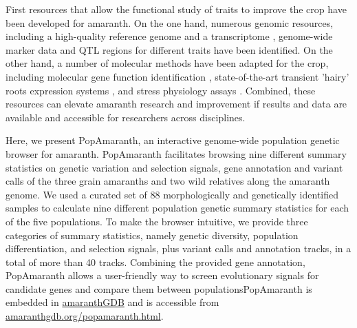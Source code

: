 \documentclass[9pt,twocolumn,twoside]{celabRxiv}
\newcommand{\jgd}[1]{{\small \textcolor{red}{#1}}}
\begin{document}
First resources that allow the functional study of traits to improve the crop have been developed for amaranth.
On the one hand, numerous genomic resources, including a high-quality reference genome \citep{lightfoot2017single} and a transcriptome \citep{clouse2016amaranth}, genome-wide marker data \citep{mallory2008development, kietlinski2014relationships, stetter2017genomic, stetter2020parallel} and QTL regions for different traits \citep{lightfoot2017single,stetter2020parallel} have been identified.
On the other hand, a number of molecular methods have been adapted for the crop, including molecular gene function identification \citep{massange2016overexpression}, state-of-the-art transient 'hairy' roots expression systems \citep{hatlestad2015beet,frier2020agro}, and stress physiology assays \citep{parra2014burkholderia, delano2011transcriptomic, massange2015novel}. 
Combined, these resources can elevate amaranth research and improvement if results and data are available and accessible for researchers across disciplines.
 
Here, we present PopAmaranth, an interactive genome-wide population genetic browser for amaranth. 
PopAmaranth facilitates browsing nine different summary statistics on genetic variation and selection signals, gene annotation and variant calls of the three grain amaranths and two wild relatives along the amaranth genome.
We used a curated set of 88 morphologically and genetically identified samples to calculate nine different population genetic summary statistics for each of the five populations. 
To make the browser intuitive, we provide three categories of summary statistics, namely genetic diversity, population differentiation, and selection signals, plus variant calls and annotation tracks, in a total of more than 40 tracks.
Combining the provided gene annotation, PopAmaranth allows a user-friendly way to screen evolutionary signals for candidate genes and compare them between populationsPopAmaranth is embedded in \href{www.amaranthgdb.org}{amaranthGDB} and is accessible from \href{https://amaranthgdb.org/popamaranth.html}{amaranthgdb.org/popamaranth.html}.

 
\end{document}
